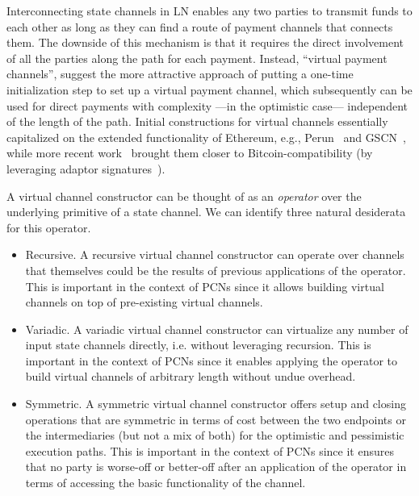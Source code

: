 Interconnecting state channels in LN enables any two parties to transmit funds to each other as long as they can find a route of payment channels that connects them. The downside of this mechanism is that it requires the direct involvement of all the parties along the path for each payment. Instead, ``virtual payment channels'', suggest the more attractive approach of putting a one-time initialization step to set up a virtual payment channel, which subsequently can be used for direct payments with complexity  ---in the optimistic case---  independent of the length of the path.
Initial constructions for virtual channels essentially capitalized on the extended functionality of Ethereum, e.g., 
Perun~\cite{perun} and GSCN~\cite{DBLP:conf/ccs/DziembowskiFH18}, while more
recent work~\cite{cryptoeprint:2020:554}  brought them closer to
Bitcoin-compatibility (by leveraging adaptor
signatures~\cite{cryptoeprint:2020:476}).

A virtual channel constructor can be thought of as an  {\em operator} over the underlying primitive of a state channel. We can identify three   natural desiderata for this operator. 

\begin{itemize}
\item Recursive. A recursive virtual channel constructor can operate over channels that themselves could be the results of previous applications of the operator. This is important in the context of PCNs since it allows building virtual channels on top of pre-existing virtual channels.
\item Variadic. A variadic virtual channel constructor can virtualize any number
of input state channels directly, i.e. without leveraging recursion. This is
important in the context of PCNs since it enables applying the operator to build
virtual channels of arbitrary length without undue overhead.
\item Symmetric. A symmetric virtual channel constructor offers setup and closing operations that are symmetric in terms of cost between the two endpoints or the intermediaries (but not a mix of both) for the optimistic and pessimistic execution paths. This is important in the context of PCNs since it ensures that no party is worse-off or better-off after an application of the operator in terms of accessing the basic functionality of the channel. 
\end{itemize}

